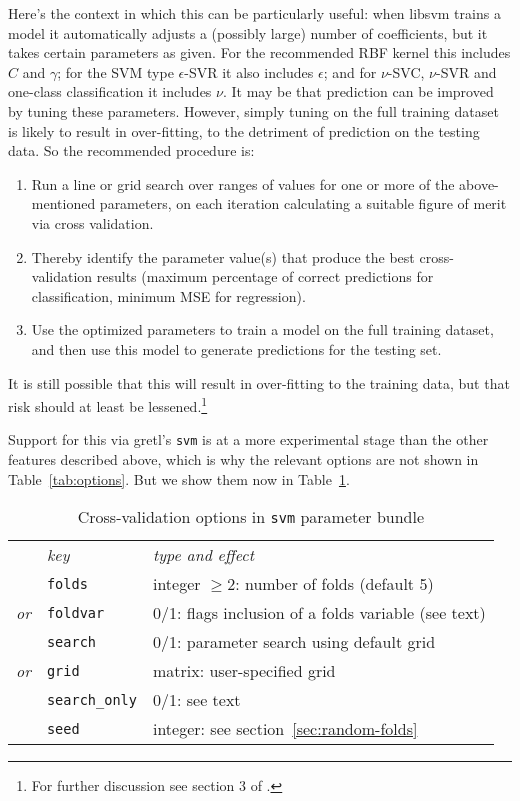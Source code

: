 \documentclass{article}
\begin{document}
Here's the context in which this can be particularly useful: when
\textsf{libsvm} trains a model it automatically adjusts a (possibly
large) number of coefficients, but it takes certain parameters as
given. For the recommended RBF kernel this includes $C$ and $\gamma$;
for the SVM type $\epsilon$-SVR it also includes $\epsilon$; and for
$\nu$-SVC, $\nu$-SVR and one-class classification it includes
$\nu$. It may be that prediction can be improved by tuning these
parameters. However, simply tuning on the full training dataset is
likely to result in over-fitting, to the detriment of prediction on
the testing data. So the recommended procedure is:
\begin{enumerate}
\item Run a line or grid search over ranges of values for one or more
  of the above-mentioned parameters, on each iteration calculating a
  suitable figure of merit via cross validation.
\item Thereby identify the parameter value(s) that produce the
  best cross-validation results (maximum percentage of correct
  predictions for classification, minimum MSE for regression).
\item Use the optimized parameters to train a model on the full
  training dataset, and then use this model to generate predictions
  for the testing set.
\end{enumerate}

It is still possible that this will result in over-fitting to the
training data, but that risk should at least be lessened.\footnote{For
  further discussion see section 3 of \cite{HCL16}.}

Support for this via gretl's \texttt{svm} is at a more experimental
stage than the other features described above, which is why the
relevant options are not shown in Table~\ref{tab:options}.  But 
we show them now in Table~\ref{tab:xvalid}.

\begin{table}[htbp]
  \centering
  \begin{tabular}{lll}
  & \textit{key} & \textit{type and effect} \\[2pt]
   & \texttt{folds} & integer $\geq 2$: number of folds (default 5) \\
  \textit{or} & \texttt{foldvar} & 0/1: flags inclusion of a folds variable
    (see text) \\[2pt]
   & \texttt{search} & 0/1: parameter search using default grid \\
 \textit{or} & \texttt{grid} & matrix: user-specified grid \\[2pt]
    & \texttt{search\_only} & 0/1: see text \\
    & \texttt{seed} & integer: see section~\ref{sec:random-folds}
  \end{tabular}
  \caption{Cross-validation options in \texttt{svm} parameter bundle}
  \label{tab:xvalid}
\end{table}
\end{document}
